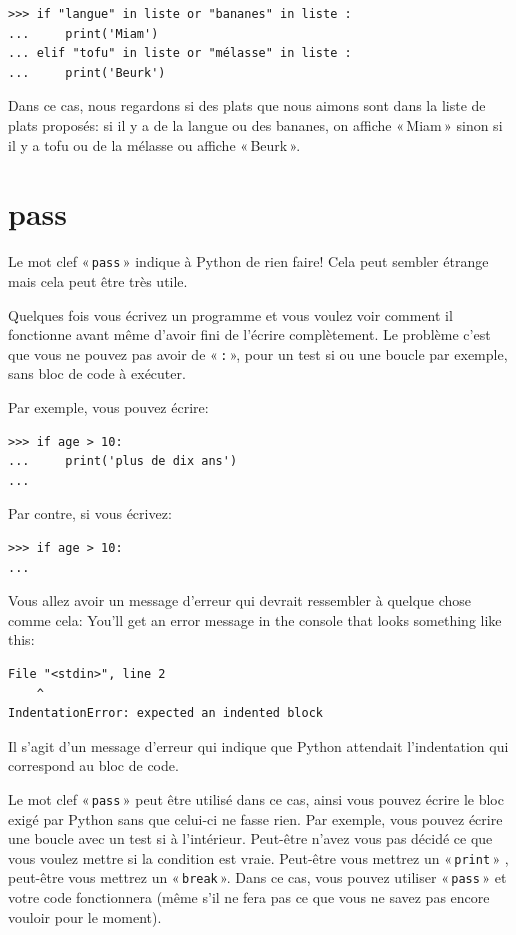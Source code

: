 \begin{Verbatim}[frame=single,rulecolor=\color{gray}]
>>> if "langue" in liste or "bananes" in liste :
...     print('Miam')
... elif "tofu" in liste or "mélasse" in liste :
...     print('Beurk')
\end{Verbatim}

Dans ce cas, nous regardons si des plats que nous aimons sont dans la liste de plats proposés: si il y a de la langue ou des bananes, on affiche « Miam » sinon si il y a tofu ou de la mélasse ou affiche « Beurk ».


\section*{pass}

Le mot clef « \texttt{pass} » indique à Python de rien faire! Cela peut sembler étrange mais cela peut être très utile. 

Quelques fois vous écrivez un programme et vous voulez voir comment il fonctionne avant même d'avoir  fini de l'écrire complètement. Le problème c'est que vous ne pouvez pas avoir de « \texttt{:} », pour un test si ou une boucle par exemple, sans bloc de code à exécuter.

Par exemple, vous pouvez écrire:
\begin{Verbatim}[frame=single,rulecolor=\color{gray}]
>>> if age > 10:
...     print('plus de dix ans')
...
\end{Verbatim}

Par contre, si vous écrivez:
\begin{Verbatim}[frame=single,rulecolor=\color{gray}]
>>> if age > 10:
...
\end{Verbatim}
Vous allez avoir un message d'erreur qui devrait ressembler à quelque chose comme cela:
\noindent
You'll get an error message in the console that looks something like this:

\begin{Verbatim}[frame=single,rulecolor=\color{gray}]
  File "<stdin>", line 2
    ^
IndentationError: expected an indented block
\end{Verbatim}

Il s'agit d'un message d'erreur qui indique que Python attendait l'indentation qui correspond au bloc de code.

Le mot clef « \texttt{pass} » peut être utilisé dans ce cas, ainsi vous pouvez écrire le bloc exigé par Python sans que celui-ci ne fasse rien.
Par exemple, vous pouvez écrire une boucle avec un test si à l'intérieur. Peut-être n'avez vous pas décidé ce que vous voulez mettre si la condition est vraie. Peut-être vous mettrez un « \texttt{print} » , peut-être vous mettrez un « \texttt{break} ». Dans ce cas, vous pouvez utiliser « \texttt{pass} » et votre code fonctionnera (même s'il ne fera pas ce que vous ne savez pas encore vouloir pour le moment).

